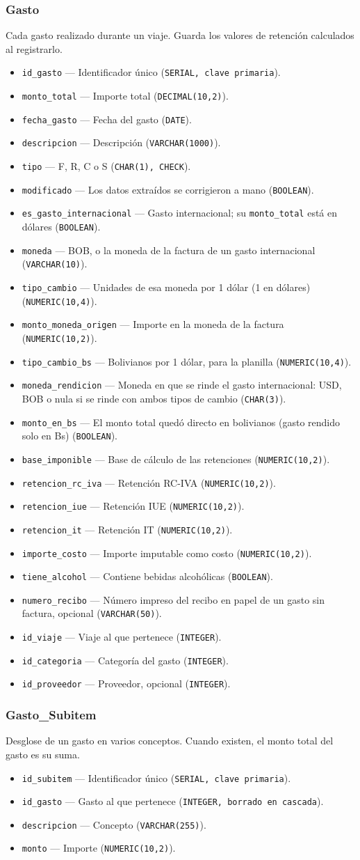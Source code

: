 \documentclass[11pt,letterpaper]{article}
\newcommand{\code}[1]{\nolinkurl{#1}}
\newcommand{\campo}[3]{\item \code{#1} --- #2 (\texttt{#3}).}
\begin{document}
\subsubsection{Gasto}
Cada gasto realizado durante un viaje. Guarda los valores de retención calculados al registrarlo.
\begin{itemize}
  \campo{id_gasto}{Identificador único}{SERIAL, clave primaria}
  \campo{monto_total}{Importe total}{DECIMAL(10,2)}
  \campo{fecha_gasto}{Fecha del gasto}{DATE}
  \campo{descripcion}{Descripción}{VARCHAR(1000)}
  \campo{tipo}{F, R, C o S}{CHAR(1), CHECK}
  \campo{modificado}{Los datos extraídos se corrigieron a mano}{BOOLEAN}
  \campo{es_gasto_internacional}{Gasto internacional; su \code{monto_total} está en dólares}{BOOLEAN}
  \campo{moneda}{BOB, o la moneda de la factura de un gasto internacional}{VARCHAR(10)}
  \campo{tipo_cambio}{Unidades de esa moneda por 1 dólar (1 en dólares)}{NUMERIC(10,4)}
  \campo{monto_moneda_origen}{Importe en la moneda de la factura}{NUMERIC(10,2)}
  \campo{tipo_cambio_bs}{Bolivianos por 1 dólar, para la planilla}{NUMERIC(10,4)}
  \campo{moneda_rendicion}{Moneda en que se rinde el gasto internacional: USD, BOB o nula si se rinde con ambos tipos de cambio}{CHAR(3)}
  \campo{monto_en_bs}{El monto total quedó directo en bolivianos (gasto rendido solo en Bs)}{BOOLEAN}
  \campo{base_imponible}{Base de cálculo de las retenciones}{NUMERIC(10,2)}
  \campo{retencion_rc_iva}{Retención RC-IVA}{NUMERIC(10,2)}
  \campo{retencion_iue}{Retención IUE}{NUMERIC(10,2)}
  \campo{retencion_it}{Retención IT}{NUMERIC(10,2)}
  \campo{importe_costo}{Importe imputable como costo}{NUMERIC(10,2)}
  \campo{tiene_alcohol}{Contiene bebidas alcohólicas}{BOOLEAN}
  \campo{numero_recibo}{Número impreso del recibo en papel de un gasto sin factura, opcional}{VARCHAR(50)}
  \campo{id_viaje}{Viaje al que pertenece}{INTEGER}
  \campo{id_categoria}{Categoría del gasto}{INTEGER}
  \campo{id_proveedor}{Proveedor, opcional}{INTEGER}
\end{itemize}

\subsubsection{Gasto\_Subitem}
Desglose de un gasto en varios conceptos. Cuando existen, el monto total del gasto es su suma.
\begin{itemize}
  \campo{id_subitem}{Identificador único}{SERIAL, clave primaria}
  \campo{id_gasto}{Gasto al que pertenece}{INTEGER, borrado en cascada}
  \campo{descripcion}{Concepto}{VARCHAR(255)}
  \campo{monto}{Importe}{NUMERIC(10,2)}
\end{itemize}
\end{document}

